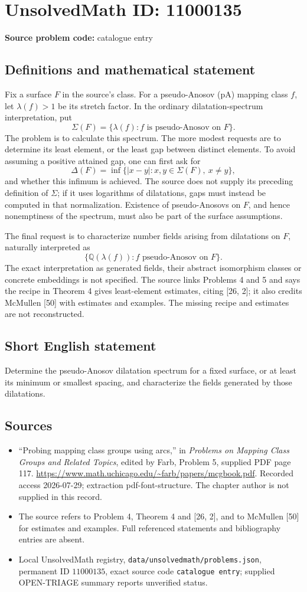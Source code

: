 \documentclass[11pt]{article}
\newcommand{\Q}{\mathbb{Q}}
\begin{document}
\section*{UnsolvedMath ID: 11000135}
\textbf{Source problem code:} catalogue entry
\subsection{Definitions and mathematical statement}
Fix a surface \(F\) in the source's class. For a pseudo-Anosov (pA) mapping class \(f\), let \(\lambda(f)>1\) be its stretch factor. In the ordinary dilatation-spectrum interpretation, put
\[
 \Sigma(F)=\{\lambda(f):f\text{ is pseudo-Anosov on }F\}.
\]
The problem is to calculate this spectrum. The more modest requests are to determine its least element, or the least gap between distinct elements. To avoid assuming a positive attained gap, one can first ask for
\[
 \Delta(F)=\inf\{|x-y|:x,y\in\Sigma(F),\ x\ne y\},
\]
and whether this infimum is achieved. The source does not supply its preceding definition of \(\Sigma\); if it uses logarithms of dilatations, gaps must instead be computed in that normalization. Existence of pseudo-Anosovs on \(F\), and hence nonemptiness of the spectrum, must also be part of the surface assumptions.

The final request is to characterize number fields arising from dilatations on \(F\), naturally interpreted as
\[
 \{\Q(\lambda(f)):f\text{ pseudo-Anosov on }F\}.
\]
The exact interpretation as generated fields, their abstract isomorphism classes or concrete embeddings is not specified. The source links Problems 4 and 5 and says the recipe in Theorem 4 gives least-element estimates, citing [26, 2]; it also credits McMullen [50] with estimates and examples. The missing recipe and estimates are not reconstructed.
\subsection{Short English statement}
Determine the pseudo-Anosov dilatation spectrum for a fixed surface, or at least its minimum or smallest spacing, and characterize the fields generated by those dilatations.
\subsection{Sources}
\begin{itemize}
\item ``Probing mapping class groups using arcs,'' in \emph{Problems on Mapping Class Groups and Related Topics}, edited by Farb, Problem 5, supplied PDF page 117. \url{https://www.math.uchicago.edu/~farb/papers/mcgbook.pdf}. Recorded access 2026-07-29; extraction pdf-font-structure. The chapter author is not supplied in this record.
\item The source refers to Problem 4, Theorem 4 and [26, 2], and to McMullen [50] for estimates and examples. Full referenced statements and bibliography entries are absent.
\item Local UnsolvedMath registry, \texttt{data/unsolvedmath/problems.json}, permanent ID \(11000135\), exact source code \texttt{catalogue entry}; supplied OPEN-TRIAGE summary reports unverified status.
\end{itemize}
\end{document}
